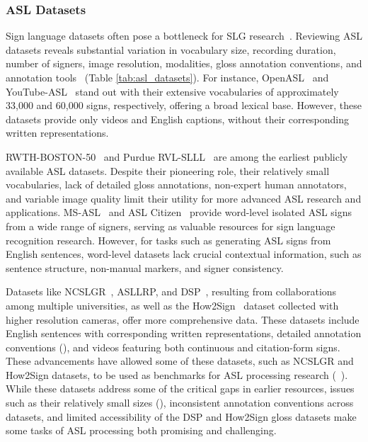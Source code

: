 % 

\subsubsection{ASL Datasets} 
\label{subsubsec:asl_datasets}
Sign language datasets often pose a bottleneck for SLG research~\cite{bragg_sign_2019}. Reviewing ASL datasets reveals substantial variation in vocabulary size, recording duration, number of signers, image resolution, modalities, gloss annotation conventions, and annotation tools~\cite{zahedi2005combination,dreuw2008benchmark,martinez2002purdue,joze2018ms,neidle2012new,neidle2022asl,desai2024asl,signingsavvy,duarte_how2sign_2021,shi2022open,uthus2023youtubeasl} (Table \ref{tab:asl_datasets}). For instance, OpenASL~\cite{shi2022open} and YouTube-ASL~\cite{uthus2023youtubeasl} stand out with their extensive vocabularies of approximately 33,000 and 60,000 signs, respectively, offering a broad lexical base. However, these datasets provide only videos and English captions, without their corresponding written representations. 

RWTH-BOSTON-50~\cite{zahedi2005combination} and Purdue RVL-SLLL~\cite{martinez2002purdue} are among the earliest publicly available ASL datasets. Despite their pioneering role, their relatively small vocabularies, lack of detailed gloss annotations, non-expert human annotators, and variable image quality limit their utility for more advanced ASL research and applications. MS-ASL~\cite{joze2018ms} and ASL Citizen~\cite{desai2024asl} provide word-level isolated ASL signs from a wide range of signers, serving as valuable resources for sign language recognition research. However, for tasks such as generating ASL signs from English sentences, word-level datasets lack crucial contextual information, such as sentence structure, non-manual markers, and signer consistency.

Datasets like NCSLGR~\cite{neidle2012new}, ASLLRP\cite{neidleboston}, and DSP~\cite{neidle2022asl}, resulting from collaborations among multiple universities, as well as the How2Sign~\cite{duarte_how2sign_2021} dataset collected with higher resolution cameras, offer more comprehensive data. These datasets include English sentences with corresponding written representations, detailed annotation conventions (\eg \cite{neidle2001signstream,neidle2007signstream}), and videos featuring both continuous and citation-form signs. These advancements have allowed some of these datasets, such as NCSLGR and How2Sign datasets, to be used as benchmarks for ASL processing research (\eg~\cite{zhu_neural_2023,moryossef_data_2021,baltatzis2024neural}). While these datasets address some of the critical gaps in earlier resources, issues such as their relatively small sizes (\eg \cite{neidle2012new,neidle2022asl}), inconsistent annotation conventions across datasets, and limited accessibility of the DSP and How2Sign gloss datasets make some tasks of ASL processing both promising and challenging. 